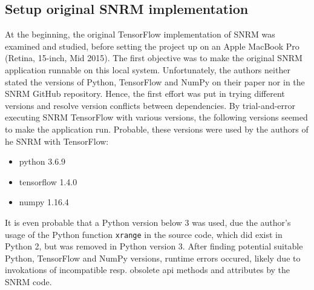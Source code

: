 \subsection{Setup original SNRM implementation}
At the beginning, the original TensorFlow implementation of SNRM was examined and studied,
    before setting the project up on an Apple MacBook Pro (Retina, 15-inch, Mid 2015).
The first objective was to make the original SNRM application runnable on this local system.
Unfortunately, the authors neither stated the versions of Python, TensorFlow and NumPy on their paper nor 
    in the SNRM GitHub repository.
Hence, the first effort was put in trying different versions and resolve version conflicts between dependencies.
By trial-and-error executing SNRM TensorFlow with various versions, the following versions seemed to make the   
    application run.
Probable, these versions were used by the authors of he SNRM with TensorFlow:
\begin{itemize}
    \item python 3.6.9
    \item tensorflow 1.4.0
    \item numpy 1.16.4
\end{itemize}
It is even probable that a Python version below 3 was used, due the author's usage of the Python 
    function \texttt{xrange} in the source code, which did exist in Python 2, but was removed in Python version 3.
After finding potential suitable Python, TensorFlow and NumPy versions, runtime errors occured, likely due to 
    invokations of incompatible resp. obsolete api methods and attributes by the SNRM code.

